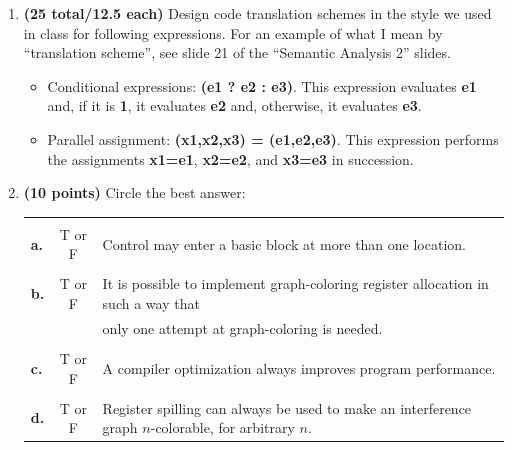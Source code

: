 \documentclass[11pt]{article} %
\begin{document}
\begin{enumerate}

\item {\bf (25 total/12.5 each)} Design code translation schemes in the style we used in class for following expressions. For an example of what I mean by ``translation scheme'', see slide 21 of the ``Semantic Analysis 2'' slides.
\begin{itemize}
\item Conditional expressions: {\bf{(e1 ? e2 : e3)}}.
This expression evaluates {\bf e1} and, if it is {\bf 1}, it evaluates {\bf{e2}} and, otherwise, it evaluates {\bf{e3}}.
\vfill

\item Parallel assignment: {\bf (x1,x2,x3) = (e1,e2,e3)}. This expression performs the assignments {\bf x1=e1}, {\bf x2=e2}, and {\bf x3=e3} in succession.
\vfill
\end{itemize}

\newpage

\item {\bf (10 points)} Circle the best answer:

\begin{tabular}{lcl}
\\
\\
 {\bf{a.}} & T or F & Control may enter a basic block at more than one location.
\\
\\
 {\bf{b.}} & T or F &
It is possible to implement graph-coloring register allocation in such a way that\\
&& only
one attempt at graph-coloring is needed.
\\
\\
 {\bf{c.}} & T or F &
A compiler optimization always improves program performance.
\\
\\
 {\bf{d.}} & T or F &
Register spilling can always be used to make an interference graph $n$-colorable, for arbitrary $n$.
\end{tabular}
\vspace{2ex}


\end{enumerate}
\end{document}
